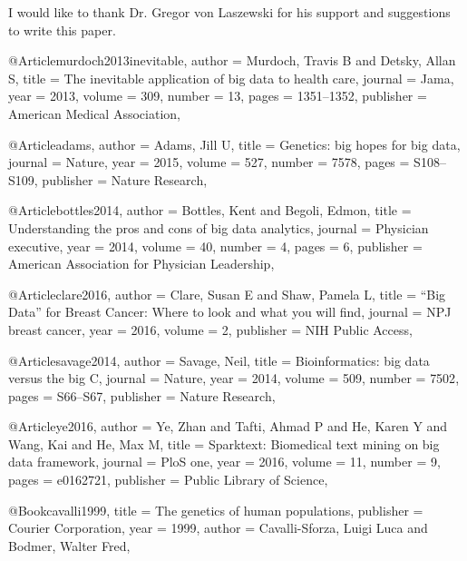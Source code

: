 \documentclass[sigconf]{acmart}
\begin{document}
\begin{acks}

  I would like to thank Dr. Gregor von Laszewski for his
  support and suggestions to write this paper.

\end{acks}




@Article{murdoch2013inevitable,
  author    = {Murdoch, Travis B and Detsky, Allan S},
  title     = {The inevitable application of big data to health care},
  journal   = {Jama},
  year      = {2013},
  volume    = {309},
  number    = {13},
  pages     = {1351--1352},
  publisher = {American Medical Association},
}

@Article{adams,
  author    = {Adams, Jill U},
  title     = {Genetics: big hopes for big data},
  journal   = {Nature},
  year      = {2015},
  volume    = {527},
  number    = {7578},
  pages     = {S108--S109},
  publisher = {Nature Research},
}

@Article{bottles2014,
  author    = {Bottles, Kent and Begoli, Edmon},
  title     = {Understanding the pros and cons of big data analytics},
  journal   = {Physician executive},
  year      = {2014},
  volume    = {40},
  number    = {4},
  pages     = {6},
  publisher = {American Association for Physician Leadership},
}

@Article{clare2016,
  author    = {Clare, Susan E and Shaw, Pamela L},
  title     = {“Big Data” for Breast Cancer: Where to look and what you will find},
  journal   = {NPJ breast cancer},
  year      = {2016},
  volume    = {2},
  publisher = {NIH Public Access},
}

@Article{savage2014,
  author    = {Savage, Neil},
  title     = {Bioinformatics: big data versus the big C},
  journal   = {Nature},
  year      = {2014},
  volume    = {509},
  number    = {7502},
  pages     = {S66--S67},
  publisher = {Nature Research},
}

@Article{ye2016,
  author    = {Ye, Zhan and Tafti, Ahmad P and He, Karen Y and Wang, Kai and He, Max M},
  title     = {Sparktext: Biomedical text mining on big data framework},
  journal   = {PloS one},
  year      = {2016},
  volume    = {11},
  number    = {9},
  pages     = {e0162721},
  publisher = {Public Library of Science},
}

@Book{cavalli1999,
  title     = {The genetics of human populations},
  publisher = {Courier Corporation},
  year      = {1999},
  author    = {Cavalli-Sforza, Luigi Luca and Bodmer, Walter Fred},
}
\end{document}
